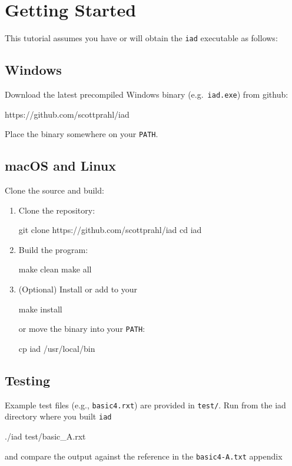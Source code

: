
\chapter{Getting Started}

This tutorial assumes you have or will obtain the \texttt{iad} executable as follows:

\section{Windows}
Download the latest precompiled Windows binary (e.g.\ \texttt{iad.exe}) from github:
\begin{grayverb}
https://github.com/scottprahl/iad
\end{grayverb}
Place the binary somewhere on your \texttt{PATH}.

\section{macOS and Linux}
Clone the source and build:
\begin{enumerate}
  \item Clone the repository:
    \begin{grayverb}
git clone https://github.com/scottprahl/iad
cd iad
    \end{grayverb}
  \item Build the program:
    \begin{grayverb}
make clean
make all
    \end{grayverb}
  \item (Optional) Install or add to your 
    \begin{grayverb}
make install
    \end{grayverb}
or move the binary into your \texttt{PATH}:
    \begin{grayverb}
cp iad /usr/local/bin
    \end{grayverb}
\end{enumerate}

\section{Testing}
Example test files (e.g., \texttt{basic4.rxt}) are provided in \texttt{test/}. Run from the iad directory where you built \texttt{iad}
\begin{grayverb}
./iad test/basic_A.rxt
\end{grayverb}
and compare the output against the reference in the \texttt{basic4-A.txt} appendix
